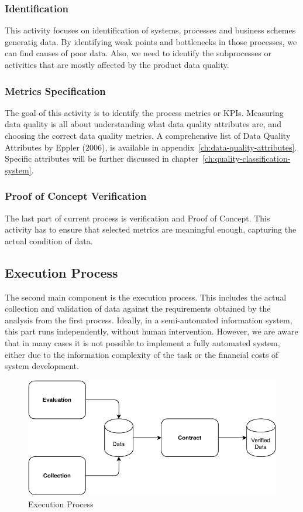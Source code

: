 \subsubsection{Identification}

This activity focuses on identification of systems, processes and business schemes generatig data.
By identifying weak points and bottlenecks in those processes, we can find causes of poor data.
Also, we need to identify the subprocesses or activities that are mostly affected by the product data quality.

\subsubsection{Metrics Specification}

The goal of this activity is to identify the process metrics or KPIs.
Measuring data quality is all about understanding what data quality attributes are, and choosing the correct data quality metrics.
A comprehensive list of Data Quality Attributes by Eppler (2006), is available in appendix~\ref{ch:data-quality-attributes}.
Specific attributes will be further discussed in chapter~\ref{ch:quality-classification-system}.

\subsubsection{Proof of Concept Verification}

The last part of current process is verification and Proof of Concept.
This activity has to ensure that selected metrics are meaningful enough, capturing the actual condition of data.

\subsection{Execution Process}

The second main component is the execution process.
This includes the actual collection and validation of data against the requirements obtained by the analysis from the first process.
Ideally, in a semi-automated information system, this part runs independently, without human intervention.
However, we are aware that in many cases it is not possible to implement a fully automated system, either due to the information complexity of the task or the financial costs of system development.

\begin{figure}[htb]
    \centering
    \includegraphics[width=.8\textwidth]{figures/execution-process.pdf}
    \caption{Execution Process}
    \label{fig:execution-process}
\end{figure}
\FloatBarrier

